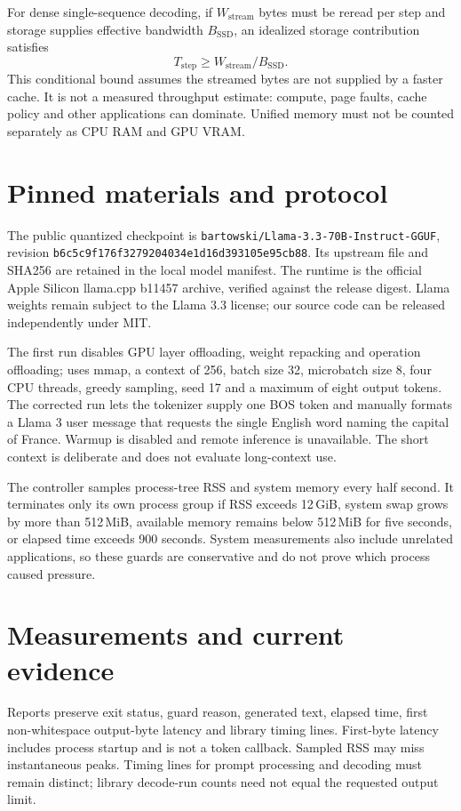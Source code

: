 \documentclass[11pt]{article}
\begin{document}
For dense single-sequence decoding, if $W_{\mathrm{stream}}$ bytes must be reread per step and storage supplies effective bandwidth $B_{\mathrm{SSD}}$, an idealized storage contribution satisfies
\begin{equation}
 T_{\mathrm{step}}\geq W_{\mathrm{stream}}/B_{\mathrm{SSD}}.
\end{equation}
This conditional bound assumes the streamed bytes are not supplied by a faster cache. It is not a measured throughput estimate: compute, page faults, cache policy and other applications can dominate. Unified memory must not be counted separately as CPU RAM and GPU VRAM.

\section{Pinned materials and protocol}
The public quantized checkpoint is
\texttt{bartowski/Llama-3.3-70B-Instruct-GGUF}, revision
\texttt{b6c5c9f176f3279204034e1d16d393105e95cb88}. Its upstream file and SHA256 are retained in the local model manifest. The runtime is the official Apple Silicon llama.cpp b11457 archive, verified against the release digest. Llama weights remain subject to the Llama 3.3 license; our source code can be released independently under MIT.

The first run disables GPU layer offloading, weight repacking and operation offloading; uses mmap, a context of 256, batch size 32, microbatch size 8, four CPU threads, greedy sampling, seed 17 and a maximum of eight output tokens. The corrected run lets the tokenizer supply one BOS token and manually formats a Llama 3 user message that requests the single English word naming the capital of France. Warmup is disabled and remote inference is unavailable. The short context is deliberate and does not evaluate long-context use.

The controller samples process-tree RSS and system memory every half second. It terminates only its own process group if RSS exceeds 12\,GiB, system swap grows by more than 512\,MiB, available memory remains below 512\,MiB for five seconds, or elapsed time exceeds 900 seconds. System measurements also include unrelated applications, so these guards are conservative and do not prove which process caused pressure.

\section{Measurements and current evidence}
Reports preserve exit status, guard reason, generated text, elapsed time, first non-whitespace output-byte latency and library timing lines. First-byte latency includes process startup and is not a token callback. Sampled RSS may miss instantaneous peaks. Timing lines for prompt processing and decoding must remain distinct; library decode-run counts need not equal the requested output limit.
\end{document}

